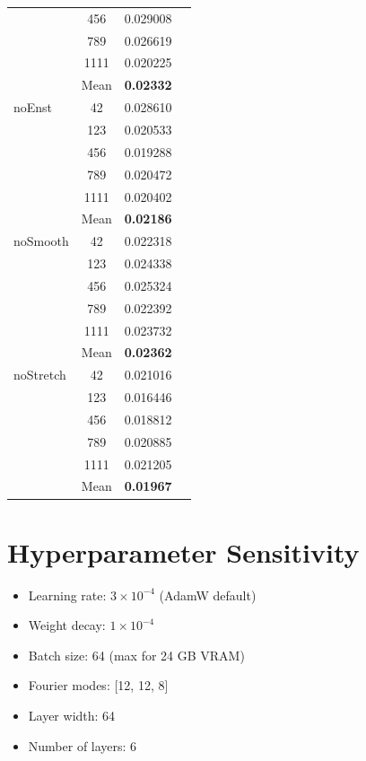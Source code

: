 \documentclass[review]{elsarticle}
\begin{document}
\begin{table}[h]
\begin{tabular}{lccc}
& 456 & 0.029008 \\
& 789 & 0.026619 \\
& 1111 & 0.020225 \\
& Mean & \textbf{0.02332} \\
\midrule
noEnst & 42 & 0.028610 \\
& 123 & 0.020533 \\
& 456 & 0.019288 \\
& 789 & 0.020472 \\
& 1111 & 0.020402 \\
& Mean & \textbf{0.02186} \\
\midrule
noSmooth & 42 & 0.022318 \\
& 123 & 0.024338 \\
& 456 & 0.025324 \\
& 789 & 0.022392 \\
& 1111 & 0.023732 \\
& Mean & \textbf{0.02362} \\
\midrule
noStretch & 42 & 0.021016 \\
& 123 & 0.016446 \\
& 456 & 0.018812 \\
& 789 & 0.020885 \\
& 1111 & 0.021205 \\
& Mean & \textbf{0.01967} \\
\bottomrule
\end{tabular}
\end{table}

\section{Hyperparameter Sensitivity}
\label{app:hyperparams}

\begin{itemize}
    \item Learning rate: $3 \times 10^{-4}$ (AdamW default)
    \item Weight decay: $1 \times 10^{-4}$
    \item Batch size: 64 (max for 24 GB VRAM)
    \item Fourier modes: [12, 12, 8]
    \item Layer width: 64
    \item Number of layers: 6
\end{itemize}
\end{document}
